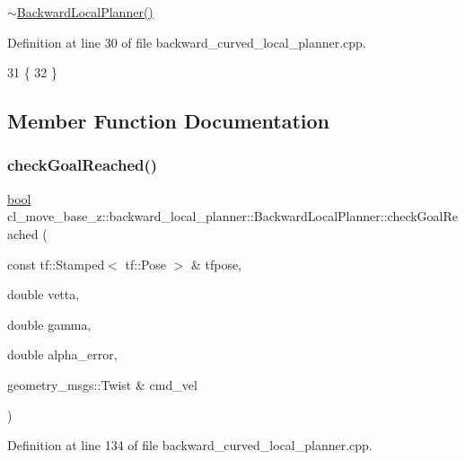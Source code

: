 \hyperlink{classcl__move__base__z_1_1backward__local__planner_1_1BackwardLocalPlanner_a6a36aa94617786c6958e861e64abb862}{$\sim$\+Backward\+Local\+Planner()} 

Definition at line 30 of file backward\+\_\+curved\+\_\+local\+\_\+planner.\+cpp.


\begin{DoxyCode}
31         \{
32         \}
\end{DoxyCode}


\subsection{Member Function Documentation}
\mbox{\label{classcl__move__base__z_1_1backward__local__planner_1_1BackwardLocalPlanner_a6c4363e82119a6a8a5a3bfe309280898}} 
\subsubsection{\texorpdfstring{check\+Goal\+Reached()}{checkGoalReached()}}
{\footnotesize\ttfamily \hyperlink{classbool}{bool} cl\+\_\+move\+\_\+base\+\_\+z\+::backward\+\_\+local\+\_\+planner\+::\+Backward\+Local\+Planner\+::check\+Goal\+Reached (\begin{DoxyParamCaption}\item[{const tf\+::\+Stamped$<$ tf\+::\+Pose $>$ \&}]{tfpose,  }\item[{double}]{vetta,  }\item[{double}]{gamma,  }\item[{double}]{alpha\+\_\+error,  }\item[{geometry\+\_\+msgs\+::\+Twist \&}]{cmd\+\_\+vel }\end{DoxyParamCaption})\hspace{0.3cm}{\ttfamily [private]}}



Definition at line 134 of file backward\+\_\+curved\+\_\+local\+\_\+planner.\+cpp.



